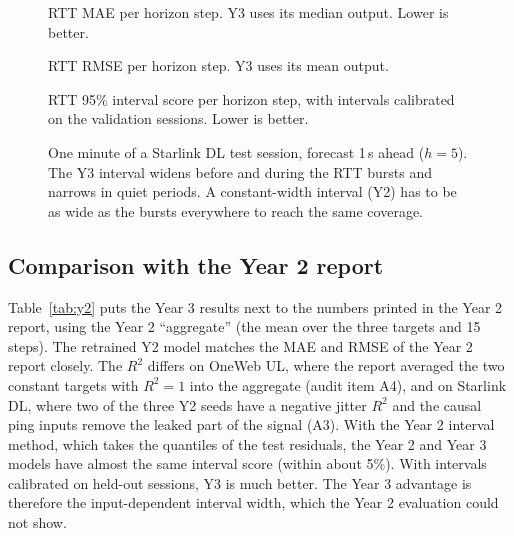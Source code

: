 \begin{figure}[p]
  \centering
  \resizebox{\linewidth}{!}{}
  \caption{RTT MAE per horizon step. Y3 uses its median output. Lower is better.}
  \label{fig:mae}
\end{figure}

\begin{figure}[p]
  \centering
  \resizebox{\linewidth}{!}{}
  \caption{RTT RMSE per horizon step. Y3 uses its mean output.}
  \label{fig:rmse}
\end{figure}

\begin{figure}[t]
  \centering
  \resizebox{\linewidth}{!}{}
  \caption{RTT 95\% interval score per horizon step, with intervals calibrated on the validation sessions. Lower is better.}
  \label{fig:mis}
\end{figure}

\begin{figure}[t]
  \centering
  \resizebox{\linewidth}{!}{}
  \caption{One minute of a Starlink DL test session, forecast 1\,s ahead ($h=5$). The Y3 interval widens before and during the RTT bursts and narrows in quiet periods. A constant-width interval (Y2) has to be as wide as the bursts everywhere to reach the same coverage.}
  \label{fig:trace}
\end{figure}

\subsection{Comparison with the Year 2 report}
Table~\ref{tab:y2} puts the Year 3 results next to the numbers printed in the Year 2 report, using the Year 2 ``aggregate'' (the mean over the three targets and 15 steps). The retrained Y2 model matches the MAE and RMSE of the Year 2 report closely. The $R^2$ differs on OneWeb UL, where the report averaged the two constant targets with $R^2=1$ into the aggregate (audit item A4), and on Starlink DL, where two of the three Y2 seeds have a negative jitter $R^2$ and the causal ping inputs remove the leaked part of the signal (A3). With the Year 2 interval method, which takes the quantiles of the test residuals, the Year 2 and Year 3 models have almost the same interval score (within about 5\%). With intervals calibrated on held-out sessions, Y3 is much better. The Year 3 advantage is therefore the input-dependent interval width, which the Year 2 evaluation could not show.

